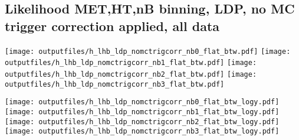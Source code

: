 \documentclass[11pt]{article}
\begin{document}










    \subsection{ Likelihood MET,HT,nB binning, LDP, no MC trigger correction applied, all data}

    \noindent
     \texttt{[image: outputfiles/h\_lhb\_ldp\_nomctrigcorr\_nb0\_flat\_btw.pdf]}
     \texttt{[image: outputfiles/h\_lhb\_ldp\_nomctrigcorr\_nb1\_flat\_btw.pdf]}
     \texttt{[image: outputfiles/h\_lhb\_ldp\_nomctrigcorr\_nb2\_flat\_btw.pdf]}
     \texttt{[image: outputfiles/h\_lhb\_ldp\_nomctrigcorr\_nb3\_flat\_btw.pdf]}

    \noindent
     \texttt{[image: outputfiles/h\_lhb\_ldp\_nomctrigcorr\_nb0\_flat\_btw\_logy.pdf]}
     \texttt{[image: outputfiles/h\_lhb\_ldp\_nomctrigcorr\_nb1\_flat\_btw\_logy.pdf]}
     \texttt{[image: outputfiles/h\_lhb\_ldp\_nomctrigcorr\_nb2\_flat\_btw\_logy.pdf]}
     \texttt{[image: outputfiles/h\_lhb\_ldp\_nomctrigcorr\_nb3\_flat\_btw\_logy.pdf]}

   \clearpage
\end{document}

